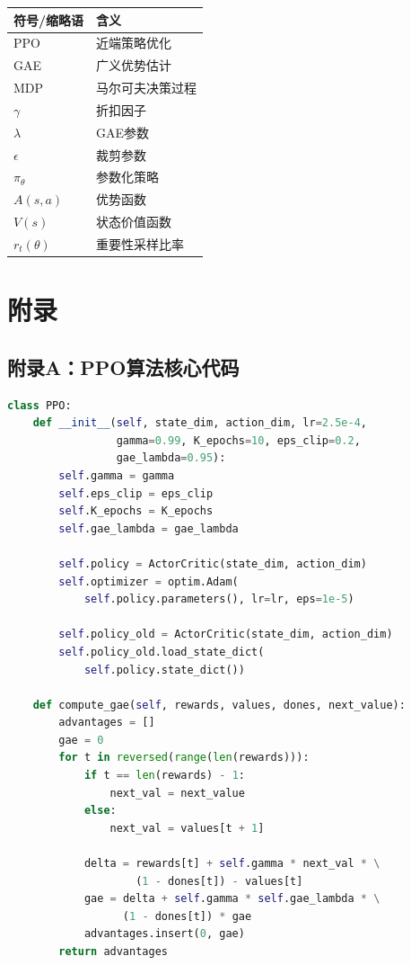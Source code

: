 \documentclass[12pt,a4paper]{article}
\begin{document}
\begin{table}[H]
    \centering
    \begin{tabular}{ll}
        \toprule
        \textbf{符号/缩略语} & \textbf{含义} \\
        \midrule
        PPO & 近端策略优化 \\
        GAE & 广义优势估计 \\
        MDP & 马尔可夫决策过程 \\
        $\gamma$ & 折扣因子 \\
        $\lambda$ & GAE参数 \\
        $\epsilon$ & 裁剪参数 \\
        $\pi_\theta$ & 参数化策略 \\
        $A(s,a)$ & 优势函数 \\
        $V(s)$ & 状态价值函数 \\
        $r_t(\theta)$ & 重要性采样比率 \\
        \bottomrule
    \end{tabular}
\end{table}

\newpage

\section*{附录}

\subsection*{附录A：PPO算法核心代码}

\begin{lstlisting}[language=Python, caption={PPO算法核心实现}]
class PPO:
    def __init__(self, state_dim, action_dim, lr=2.5e-4, 
                 gamma=0.99, K_epochs=10, eps_clip=0.2, 
                 gae_lambda=0.95):
        self.gamma = gamma
        self.eps_clip = eps_clip
        self.K_epochs = K_epochs
        self.gae_lambda = gae_lambda
        
        self.policy = ActorCritic(state_dim, action_dim)
        self.optimizer = optim.Adam(
            self.policy.parameters(), lr=lr, eps=1e-5)
        
        self.policy_old = ActorCritic(state_dim, action_dim)
        self.policy_old.load_state_dict(
            self.policy.state_dict())
    
    def compute_gae(self, rewards, values, dones, next_value):
        advantages = []
        gae = 0
        for t in reversed(range(len(rewards))):
            if t == len(rewards) - 1:
                next_val = next_value
            else:
                next_val = values[t + 1]
            
            delta = rewards[t] + self.gamma * next_val * \
                    (1 - dones[t]) - values[t]
            gae = delta + self.gamma * self.gae_lambda * \
                  (1 - dones[t]) * gae
            advantages.insert(0, gae)
        return advantages
\end{lstlisting}
\end{document}
